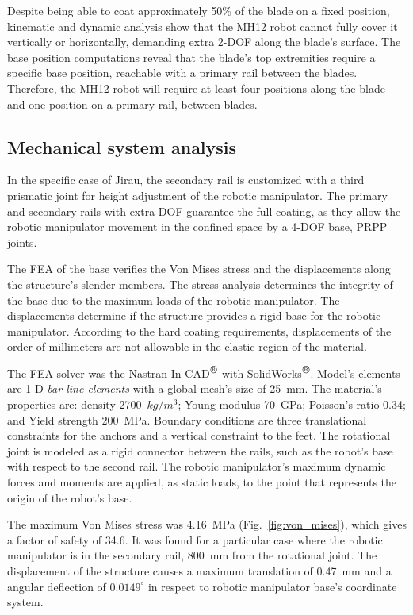 Despite being able to coat approximately 50\% of the blade on a fixed
position, kinematic and dynamic analysis show that the MH12 robot cannot fully
cover it vertically or horizontally, demanding extra 2-DOF along the blade's
surface. The base position computations reveal that the blade's top
extremities require a specific base position, reachable
with a primary rail between the blades. Therefore, the MH12 robot will require
at least four positions along the blade and one position on a primary
rail, between blades. 

\subsection{Mechanical system analysis}

In the specific case of Jirau, the secondary rail is customized with a third
prismatic joint for height adjustment of the robotic manipulator. The primary
and secondary rails with extra DOF guarantee the full coating, as they allow the
robotic manipulator movement in the confined space by a 4-DOF base, PRPP joints.

The FEA of the base verifies the Von Mises stress and the displacements
along the structure's slender members. The stress analysis determines the
integrity of the base due to the maximum loads of the robotic manipulator. The
displacements determine if the structure provides a rigid base for the robotic
manipulator. According to the hard coating requirements, displacements of the
order of millimeters are not allowable in the elastic region of the
material. 

The FEA solver was the Nastran In-CAD$^{\mbox{\small\textregistered}}$ with
SolidWorks$^{\mbox{\small\textregistered}}$. Model's elements are 1-D 
\textit{bar line elements} with a global mesh's size of 25~mm. The material's
properties are: density 2700~$kg/m^3$; Young modulus 70~GPa; Poisson's ratio
0.34; and Yield strength 200~MPa. Boundary conditions are three translational
constraints for the anchors and a vertical constraint to the feet. The
rotational joint is modeled as a rigid connector between the rails, such as the
robot's base with respect to the second rail. The robotic manipulator's maximum
dynamic forces and moments are applied, as static loads, to the point that
represents the origin of the robot's base.

The maximum Von Mises stress was 4.16~MPa (Fig.~\ref{fig:von_mises}), which
gives a factor of safety of 34.6. It was found for a particular case where the robotic manipulator is in
the secondary rail, 800~mm from the rotational joint. The displacement of the
structure causes a maximum translation of 0.47~mm and a angular deflection of
$0.0149^{\circ}$ in respect to robotic manipulator base's coordinate system. 

